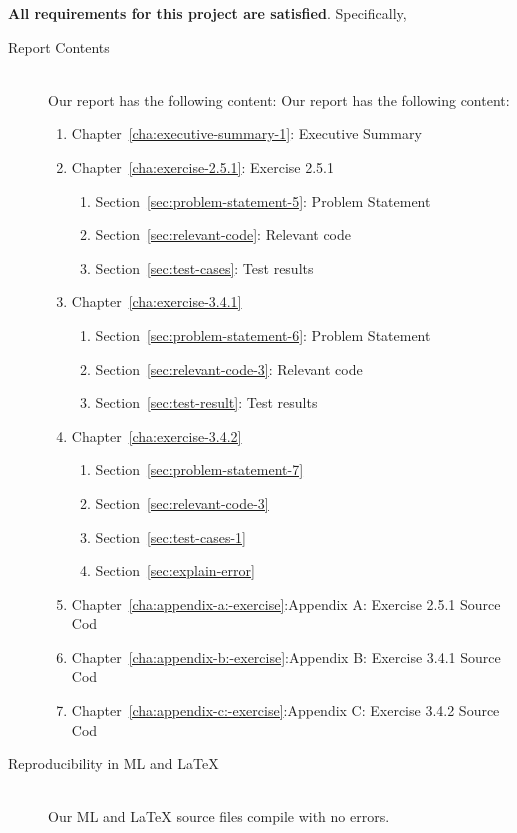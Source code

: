 \documentclass{report}
\begin{document}
\textbf{All requirements for this project are satisfied}.
Specifically,
\begin{description}
\item[Report Contents] \ \\
  Our report has the following content:
  Our report has the following content:
  \begin{enumerate}[{}]
  \item Chapter~\ref{cha:executive-summary-1}: Executive Summary
  \item Chapter~\ref{cha:exercise-2.5.1}: Exercise 2.5.1
    \begin{enumerate}[{}]
    \item Section~\ref{sec:problem-statement-5}: Problem Statement
    \item Section~\ref{sec:relevant-code}: Relevant code
    \item Section~\ref{sec:test-cases}: Test results
    \end{enumerate}

    \item Chapter~\ref{cha:exercise-3.4.1}
    \begin{enumerate}[{}]
    \item Section~\ref{sec:problem-statement-6}: Problem Statement
    \item Section~\ref{sec:relevant-code-3}: Relevant code
    \item Section~\ref{sec:test-result}: Test results
    \end{enumerate}


  \item Chapter~\ref{cha:exercise-3.4.2}
   \begin{enumerate}[{}]
   \item Section~\ref{sec:problem-statement-7}
   \item Section~\ref{sec:relevant-code-3}
   \item Section~\ref{sec:test-cases-1}
     \item Section~\ref{sec:explain-error}
   \end{enumerate}
 \item Chapter~\ref{cha:appendix-a:-exercise}:Appendix A: Exercise
   2.5.1 Source Cod
  \item Chapter~\ref{cha:appendix-b:-exercise}:Appendix B: Exercise 3.4.1 Source Cod
  \item Chapter~\ref{cha:appendix-c:-exercise}:Appendix C: Exercise 3.4.2 Source Cod

  \end{enumerate}
\item[Reproducibility in ML and \LaTeX{}] \ \\
  Our ML and \LaTeX{} source files compile with no errors.
\end{description}
\end{document}
